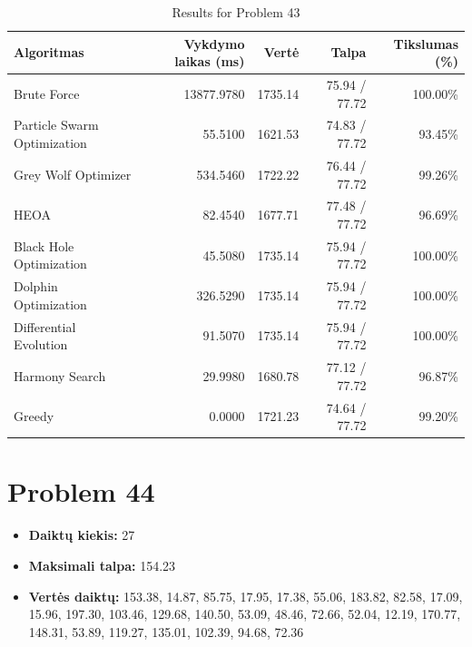 \documentclass[a4paper,11pt]{article}
\begin{document}
\begin{table}[h!]
\centering
\begin{tabular}{lrrrr}
\toprule
\textbf{Algoritmas} & \textbf{Vykdymo laikas (ms)} & \textbf{Vertė} & \textbf{Talpa} & \textbf{Tikslumas (\%)} \\
\midrule
Brute Force & 13877.9780 & 1735.14 & 75.94 / 77.72 & 100.00\% \\
Particle Swarm Optimization & 55.5100 & 1621.53 & 74.83 / 77.72 & 93.45\% \\
Grey Wolf Optimizer & 534.5460 & 1722.22 & 76.44 / 77.72 & 99.26\% \\
HEOA & 82.4540 & 1677.71 & 77.48 / 77.72 & 96.69\% \\
Black Hole Optimization & 45.5080 & 1735.14 & 75.94 / 77.72 & 100.00\% \\
Dolphin Optimization & 326.5290 & 1735.14 & 75.94 / 77.72 & 100.00\% \\
Differential Evolution & 91.5070 & 1735.14 & 75.94 / 77.72 & 100.00\% \\
Harmony Search & 29.9980 & 1680.78 & 77.12 / 77.72 & 96.87\% \\
Greedy & 0.0000 & 1721.23 & 74.64 / 77.72 & 99.20\% \\
\bottomrule
\end{tabular}
\caption{Results for Problem 43}
\end{table}
\clearpage

\section*{Problem 44}
\begin{itemize}
    \item \textbf{Daiktų kiekis:} 27
    \item \textbf{Maksimali talpa:} 154.23
    \item \textbf{Vertės daiktų:} 153.38, 14.87, 85.75, 17.95, 17.38, 55.06, 183.82, 82.58, 17.09, 15.96, 197.30, 103.46, 129.68, 140.50, 53.09, 48.46, 72.66, 52.04, 12.19, 170.77, 148.31, 53.89, 119.27, 135.01, 102.39, 94.68, 72.36
\end{itemize}
\end{document}
